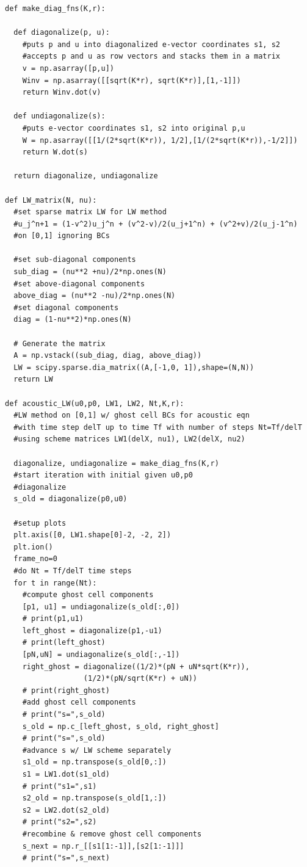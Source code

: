 \documentclass[12pt]{article}
\begin{document}
\begin{verbatim}
def make_diag_fns(K,r):

  def diagonalize(p, u):
    #puts p and u into diagonalized e-vector coordinates s1, s2
    #accepts p and u as row vectors and stacks them in a matrix
    v = np.asarray([p,u])
    Winv = np.asarray([[sqrt(K*r), sqrt(K*r)],[1,-1]])
    return Winv.dot(v)

  def undiagonalize(s):
    #puts e-vector coordinates s1, s2 into original p,u
    W = np.asarray([[1/(2*sqrt(K*r)), 1/2],[1/(2*sqrt(K*r)),-1/2]])
    return W.dot(s)

  return diagonalize, undiagonalize

def LW_matrix(N, nu):
  #set sparse matrix LW for LW method
  #u_j^n+1 = (1-v^2)u_j^n + (v^2-v)/2(u_j+1^n) + (v^2+v)/2(u_j-1^n)
  #on [0,1] ignoring BCs

  #set sub-diagonal components
  sub_diag = (nu**2 +nu)/2*np.ones(N)
  #set above-diagonal components
  above_diag = (nu**2 -nu)/2*np.ones(N)
  #set diagonal components
  diag = (1-nu**2)*np.ones(N)

  # Generate the matrix
  A = np.vstack((sub_diag, diag, above_diag))
  LW = scipy.sparse.dia_matrix((A,[-1,0, 1]),shape=(N,N))
  return LW

def acoustic_LW(u0,p0, LW1, LW2, Nt,K,r):
  #LW method on [0,1] w/ ghost cell BCs for acoustic eqn
  #with time step delT up to time Tf with number of steps Nt=Tf/delT
  #using scheme matrices LW1(delX, nu1), LW2(delX, nu2)

  diagonalize, undiagonalize = make_diag_fns(K,r)
  #start iteration with initial given u0,p0
  #diagonalize
  s_old = diagonalize(p0,u0)

  #setup plots
  plt.axis([0, LW1.shape[0]-2, -2, 2])
  plt.ion()
  frame_no=0
  #do Nt = Tf/delT time steps
  for t in range(Nt):
    #compute ghost cell components
    [p1, u1] = undiagonalize(s_old[:,0])
    # print(p1,u1)
    left_ghost = diagonalize(p1,-u1)
    # print(left_ghost)
    [pN,uN] = undiagonalize(s_old[:,-1])
    right_ghost = diagonalize((1/2)*(pN + uN*sqrt(K*r)),
                  (1/2)*(pN/sqrt(K*r) + uN))
    # print(right_ghost)
    #add ghost cell components
    # print("s=",s_old)
    s_old = np.c_[left_ghost, s_old, right_ghost]
    # print("s=",s_old)
    #advance s w/ LW scheme separately
    s1_old = np.transpose(s_old[0,:])
    s1 = LW1.dot(s1_old)
    # print("s1=",s1)
    s2_old = np.transpose(s_old[1,:])
    s2 = LW2.dot(s2_old)
    # print("s2=",s2)
    #recombine & remove ghost cell components
    s_next = np.r_[[s1[1:-1]],[s2[1:-1]]]
    # print("s=",s_next)


\end{verbatim}
\end{document}
